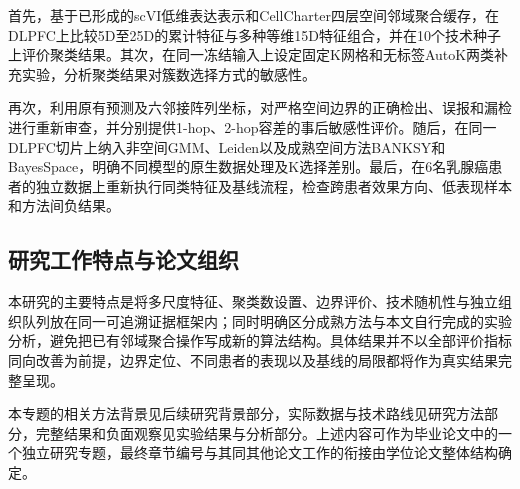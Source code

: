 首先，基于已形成的scVI低维表达表示和CellCharter四层空间邻域聚合缓存，在DLPFC上比较5D至25D的累计特征与多种等维15D特征组合，并在10个技术种子上评价聚类结果。其次，在同一冻结输入上设定固定K网格和无标签AutoK两类补充实验，分析聚类结果对簇数选择方式的敏感性。

再次，利用原有预测及六邻接阵列坐标，对严格空间边界的正确检出、误报和漏检进行重新审查，并分别提供1-hop、2-hop容差的事后敏感性评价。随后，在同一DLPFC切片上纳入非空间GMM、Leiden以及成熟空间方法BANKSY和BayesSpace，明确不同模型的原生数据处理及K选择差别。最后，在6名乳腺癌患者的独立数据上重新执行同类特征及基线流程，检查跨患者效果方向、低表现样本和方法间负结果。

\subsection{研究工作特点与论文组织}
本研究的主要特点是将多尺度特征、聚类数设置、边界评价、技术随机性与独立组织队列放在同一可追溯证据框架内；同时明确区分成熟方法与本文自行完成的实验分析，避免把已有邻域聚合操作写成新的算法结构。具体结果并不以全部评价指标同向改善为前提，边界定位、不同患者的表现以及基线的局限都将作为真实结果完整呈现。

本专题的相关方法背景见后续研究背景部分，实际数据与技术路线见研究方法部分，完整结果和负面观察见实验结果与分析部分。上述内容可作为毕业论文中的一个独立研究专题，最终章节编号与其同其他论文工作的衔接由学位论文整体结构确定。

